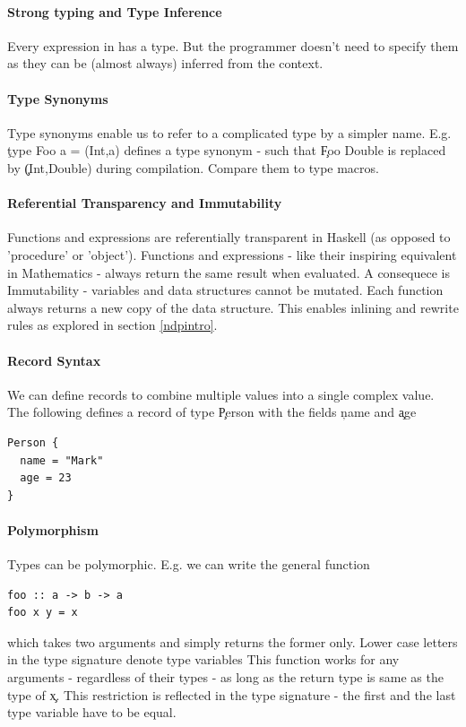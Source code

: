   \paragraph{Strong typing and Type Inference}
    Every expression in has a type. But the programmer doesn't need to
    specify them as they can be (almost always) inferred from the context.
  \paragraph{Type Synonyms}
    Type synonyms enable us to refer to a complicated type by a simpler name.
    E.g. \c{type Foo a = (Int,a)} defines a type synonym - such that
    \c{Foo Double} is replaced by \c{(Int,Double)} during compilation. Compare them to
    type macros.
  
  \paragraph{Referential Transparency and Immutability}
    Functions and expressions are referentially transparent in Haskell 
    (as opposed to 'procedure' or 'object').
    Functions and expressions - like their inspiring equivalent in
    Mathematics - always return the same result when evaluated.
    A consequece is Immutability - variables and data structures
    cannot be mutated. Each function always returns a new copy
    of the data structure. This enables inlining and rewrite rules
    as explored in section \ref{ndpintro}.
    
  \paragraph{Record Syntax}
    We can define records to combine multiple values into a single complex value.
    The following defines a record of type \c{Person} with the
    fields \c{name} and \c{age}
    \begin{lstlisting}
Person {
  name = "Mark"
  age = 23
}
    \end{lstlisting}
    
  \paragraph{Polymorphism}
    Types can be polymorphic. E.g. we can write the general function
    \begin{lstlisting}
foo :: a -> b -> a
foo x y = x
    \end{lstlisting}
    which takes two arguments and simply returns the former only.
    Lower case letters in the type signature denote type variables
    This function works for any arguments - regardless of their types -
    as long as the return type is same as the type of \c{x}. This
    restriction is reflected in the type signature - the first and
    the last type variable have to be equal.
    
